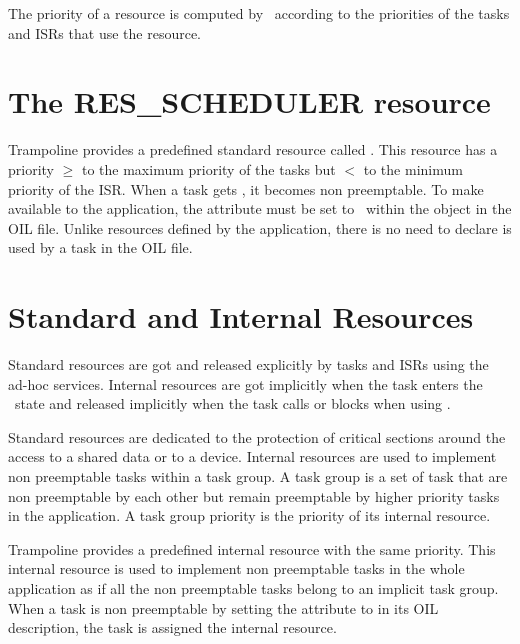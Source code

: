 The priority of a resource is computed by \goil\ according to the priorities of the tasks and ISRs that use the resource.

\section{The {\normalsize RES_SCHEDULER} resource}

Trampoline provides a predefined standard resource called . This resource has a priority $\ge$ to the maximum priority of the tasks but $<$ to the minimum priority of the ISR. When a task gets , it becomes non preemptable. To make  available to the application, the  attribute must be set to \TRUE\ within the  object in the OIL file. Unlike resources defined by the application, there is no need to declare  is used by a task in the OIL file.

\section{Standard and Internal Resources}

Standard resources are got and released explicitly by tasks and ISRs using the ad-hoc services. Internal resources are got implicitly when the task enters the \RUNNING\ state and released implicitly when the task calls  or blocks when using .


Standard resources are dedicated to the protection of critical sections around the access to a shared data or to a device. Internal resources are used to implement non preemptable tasks within a task group.
A task group is a set of task that are non preemptable by each other but remain preemptable by higher priority tasks in the application. A task group priority is the priority of its internal resource.

Trampoline provides a predefined internal  resource with the same priority. This internal resource is used to implement non preemptable tasks in the whole application as if all the non preemptable tasks belong to an implicit task group. When a task is non preemptable by setting the  attribute to  in its OIL description, the task is assigned the internal  resource.

